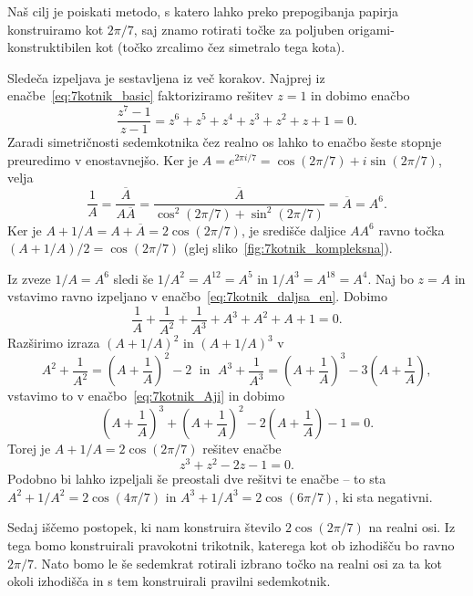 Naš cilj je poiskati metodo, s katero lahko preko prepogibanja papirja konstruiramo kot $2 \pi / 7$, saj znamo rotirati točke za poljuben origami-konstruktibilen kot (točko zrcalimo čez simetralo tega kota).

Sledeča izpeljava je sestavljena iz več korakov. Najprej iz enačbe~\ref{eq:7kotnik_basic} faktoriziramo rešitev $z = 1$ in dobimo enačbo
\begin{equation}
    \label{eq:7kotnik_daljsa_en}
    \frac{z^7-1}{z-1}= z^6+z^5+z^4+z^3+z^2+z+1=0.
\end{equation}
Zaradi simetričnosti sedemkotnika čez realno os lahko to enačbo šeste stopnje preuredimo v enostavnejšo. Ker je $A = e^{2 \pi i / 7} = \cos(2 \pi / 7) + i \sin(2 \pi / 7)$, velja
$$ \frac{1}{A} = \frac{\overline{A}}{A \overline{A}} = \frac{\overline{A}}{\cos^2(2 \pi / 7) + \sin^2(2 \pi / 7)} = \overline{A} = A^6.$$
Ker je $A + 1/A = A + \overline{A} = 2 \cos(2 \pi / 7)$, je središče daljice $A A^6$ ravno točka $(A + 1/A)/2 = \cos(2\pi /7)$ (glej sliko~\ref{fig:7kotnik_kompleksna}).

Iz zveze $1/A = A^6$ sledi še $1/A^2 = A^{12} = A^5$ in $1/A^3 = A^{18} = A^4$. Naj bo $z = A$ in vstavimo ravno izpeljano v enačbo~\ref{eq:7kotnik_daljsa_en}. Dobimo
\begin{equation}
    \label{eq:7kotnik_Aji}
    \frac{1}{A} + \frac{1}{A^2} + \frac{1}{A^3} +A^3+A^2+A+1= 0.
\end{equation}
Razširimo izraza $(A + 1/A)^2$ in $(A + 1/A)^3$ v
$$ A^2 + \frac{1}{A^2} = (A + \frac{1}{A})^2 - 2 \; \text{ in } \; A^3 + \frac{1}{A^3} = (A + \frac{1}{A})^3 - 3(A + \frac{1}{A}),$$
vstavimo to v enačbo~\ref{eq:7kotnik_Aji} in dobimo
\begin{equation*}
    (A + \frac{1}{A})^3 + (A + \frac{1}{A})^2 - 2(A + \frac{1}{A}) - 1 = 0.
\end{equation*}
Torej je $A + 1/A = 2 \cos(2 \pi / 7)$ rešitev enačbe
\begin{equation}
    \label{eq:7kotnik_kubicna}
    z^3 + z^2 - 2z - 1 = 0.
\end{equation}
Podobno bi lahko izpeljali še preostali dve rešitvi te enačbe -- to sta $A^2 + 1/A^2 = 2\cos (4 \pi / 7)$ in $A^3 + 1/A^3 = 2\cos (6 \pi / 7)$, ki sta negativni.

Sedaj iščemo postopek, ki nam konstruira število $2 \cos(2 \pi / 7)$ na realni osi. Iz tega bomo konstruirali pravokotni trikotnik, katerega kot ob izhodišču bo ravno $2 \pi /7$. Nato bomo le še sedemkrat rotirali izbrano točko na realni osi za ta kot okoli izhodišča in s tem konstruirali pravilni sedemkotnik.

